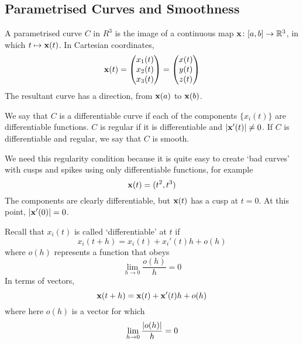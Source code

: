 \documentclass{article}
\begin{document}
\subsection{Parametrised Curves and Smoothness}
A parametrised curve $C$ in $R^3$ is the image of a continuous map $\vb x \colon [a, b] \to \mathbb R^3$, in which $t \mapsto \vb x(t)$. In Cartesian coordinates,
\[ \vb x(t) = \begin{pmatrix}
        x_1(t) \\ x_2(t) \\ x_3(t)
    \end{pmatrix} = \begin{pmatrix}
        x(t) \\ y(t) \\ z(t)
    \end{pmatrix} \]
The resultant curve has a direction, from $\vb x(a)$ to $\vb x(b)$.
\begin{definition}
    We say that $C$ is a differentiable curve if each of the components $\{x_i(t)\}$ are differentiable functions. $C$ is regular if it is differentiable and $\abs{\vb x'(t)} \neq 0$. If $C$ is differentiable and regular, we say that $C$ is smooth.
\end{definition}
\begin{note}
    We need this regularity condition because it is quite easy to create `bad curves' with cusps and spikes using only differentiable functions, for example
    \[ \vb x(t) = (t^2, t^3) \]
    The components are clearly differentiable, but $\vb x(t)$ has a cusp at $t = 0$. At this point, $\abs{\vb x'(0)} = 0$.
\end{note}
\begin{definition}
    Recall that $x_i(t)$ is called `differentiable' at $t$ if
    \[ x_i(t+h) = x_i(t) + x_i'(t)h + o(h) \]
    where $o(h)$ represents a function that obeys
    \[ \lim_{h \to 0} \frac{o(h)}{h} = 0 \]
    In terms of vectors,
    \[ \vb x(t+h) = \vb x(t) + \vb x'(t)h + o(h) \]
    where here $o(h)$ is a vector for which
    \[ \lim_{h \to 0} \frac{\abs{o(h)}}{h} = 0 \]
\end{definition}
\end{document}
